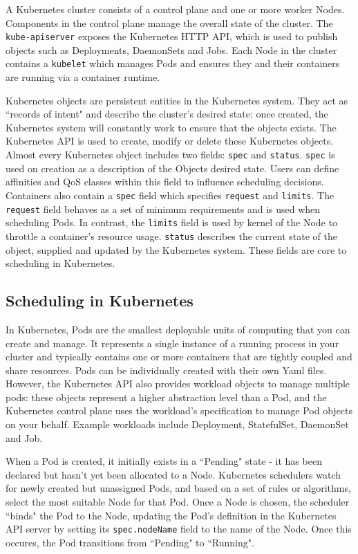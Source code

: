 A Kubernetes cluster consists of a control plane and one or more worker Nodes.
Components in the control plane manage the overall state of the cluster. The
\verb|kube-apiserver| exposes the Kubernetes HTTP API, which is used to publish
objects such as Deployments, DaemonSets and Jobs. Each
Node in the cluster contains a \verb|kubelet| which manages Pods and ensures
they and their containers are running via a container runtime.

Kubernetes objects are persistent entities in the Kubernetes system. They act as
``records of intent" and describe the cluster's desired state: once created, the
Kubernetes system will constantly work to ensure that the objects exists. The
Kubernetes API is used to create, modify or delete these Kubernetes objects. Almost
every Kubernetes object includes two fields: \verb|spec| and \verb|status|.
\verb|spec| is used on creation as a description of the Objects desired state.
Users can define affinities and QoS classes within this field to influence
scheduling decisions. Containers also contain a \verb|spec| field which
specifies \verb|request| and \verb|limits|. The \texttt{request} field behaves
as a set of minimum requirements and is used when scheduling Pods. In contrast,
the \texttt{limits} field is used by kernel of the Node to throttle a
container's resource usage. \verb|status| describes the current state of the
object, supplied and updated by the Kubernetes system. These fields are core to
scheduling in Kubernetes.

\subsection{Scheduling in Kubernetes}
In Kubernetes, Pods are the smallest deployable units of computing that you can
create and manage. It represents a single instance of a running
process in your cluster and typically contains one or more containers that are
tightly coupled and share resources. Pods can be individually created with their
own Yaml files. However, the Kubernetes API also provides workload objects to
manage multiple pods: these objects represent a higher abstraction level than a
Pod, and the Kubernetes control plane uses the workload's specification to
manage Pod objects on your behalf. Example workloads include Deployment,
StatefulSet, DaemonSet and Job.

When a Pod is created, it initially exists in a ``Pending" state - it has been
declared but hasn't yet been allocated to a Node. Kubernetes schedulers watch for
newly created but unassigned Pods, and based on a set of
rules or algorithms, select the most suitable Node for that Pod. Once a Node is
chosen, the scheduler ``binds" the Pod to the Node, updating the Pod's definition
in the Kubernetes API server by setting its \verb|spec.nodeName| field to the
name of the Node. Once this occures, the Pod transitions from ``Pending" to
``Running".

